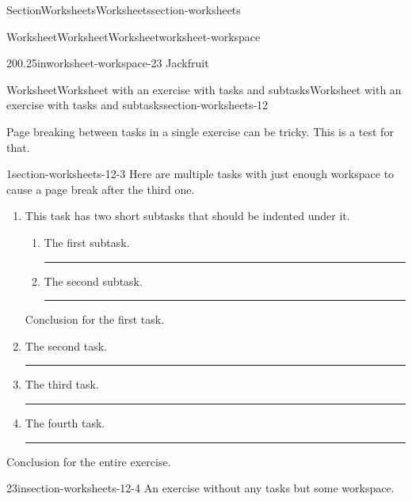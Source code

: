 \documentclass[oneside,10pt,]{article}
\newlength{\ptxworkspacestrutwidth}
\numberwithin{equation}{section}
\begin{document}
\begin{sectionptx}{Section}{Worksheets}{}{Worksheets}{}{}{section-worksheets}
\begin{worksheet-subsection}{Worksheet}{Worksheet}{}{Worksheet}{}{}{worksheet-workspace}
\begin{divisionexercise}{20}{}{0.25in}{worksheet-workspace-23}%
Jackfruit%
\end{divisionexercise}%
\end{worksheet-subsection}
\restoregeometry
%
%
\typeout{************************************************}
\typeout{************************************************}
%
\begin{worksheet-subsection}{Worksheet}{Worksheet with an exercise with tasks and subtasks}{}{Worksheet with an exercise with tasks and subtasks}{}{}{section-worksheets-12}
\begin{introduction}{}%
Page breaking between tasks in a single exercise can be tricky.  This is a test for that.%
\end{introduction}%
\begin{divisionexercise}{1}{}{}{section-worksheets-12-3}%
Here are multiple tasks with just enough workspace to cause a page break after the third one.%
\begin{enumerate}[font=\bfseries,label=(\alph*),ref=\alph*]%
\item{}This task has two short subtasks that should be indented under it.%
\begin{enumerate}[font=\bfseries,label=(\roman*),ref=\theenumi.\roman*]%
\item{}The first subtask.%
\par\rule{\ptxworkspacestrutwidth}{.5in}%
\item{}The second subtask.%
\par\rule{\ptxworkspacestrutwidth}{.5in}%
\end{enumerate}%
Conclusion for the first task.%
\item{}The second task.%
\par\rule{\ptxworkspacestrutwidth}{1.5in}%
\item{}The third task.%
\par\rule{\ptxworkspacestrutwidth}{1.5in}%
\item{}The fourth task.%
\par\rule{\ptxworkspacestrutwidth}{2in}%
\end{enumerate}%
Conclusion for the entire exercise.%
\end{divisionexercise}%
\begin{divisionexercise}{2}{}{3in}{section-worksheets-12-4}%
An exercise without any tasks but some workspace.%

\end{divisionexercise}
\end{worksheet-subsection}
\end{sectionptx}
\end{document}
